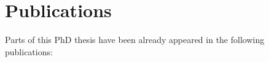 \chapter*{Publications}
Parts of this PhD thesis have been already appeared in the following publications:

\begin{refsection}
    \small
    \nocite{guse_macro-temporal_2013}
    \nocite{guse_modelling_2014}
    \nocite{weiss_temporal_2014}
    \printbibliography[heading=none]
\end{refsection}